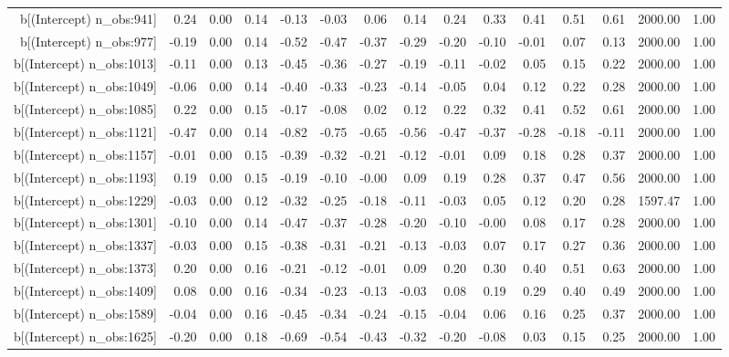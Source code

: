 \begin{table}[ht]
\begin{tabular}{rrrrrrrrrrrrrrr}
  b[(Intercept) n\_obs:941] & 0.24 & 0.00 & 0.14 & -0.13 & -0.03 & 0.06 & 0.14 & 0.24 & 0.33 & 0.41 & 0.51 & 0.61 & 2000.00 & 1.00 \\ 
  b[(Intercept) n\_obs:977] & -0.19 & 0.00 & 0.14 & -0.52 & -0.47 & -0.37 & -0.29 & -0.20 & -0.10 & -0.01 & 0.07 & 0.13 & 2000.00 & 1.00 \\ 
  b[(Intercept) n\_obs:1013] & -0.11 & 0.00 & 0.13 & -0.45 & -0.36 & -0.27 & -0.19 & -0.11 & -0.02 & 0.05 & 0.15 & 0.22 & 2000.00 & 1.00 \\ 
  b[(Intercept) n\_obs:1049] & -0.06 & 0.00 & 0.14 & -0.40 & -0.33 & -0.23 & -0.14 & -0.05 & 0.04 & 0.12 & 0.22 & 0.28 & 2000.00 & 1.00 \\ 
  b[(Intercept) n\_obs:1085] & 0.22 & 0.00 & 0.15 & -0.17 & -0.08 & 0.02 & 0.12 & 0.22 & 0.32 & 0.41 & 0.52 & 0.61 & 2000.00 & 1.00 \\ 
  b[(Intercept) n\_obs:1121] & -0.47 & 0.00 & 0.14 & -0.82 & -0.75 & -0.65 & -0.56 & -0.47 & -0.37 & -0.28 & -0.18 & -0.11 & 2000.00 & 1.00 \\ 
  b[(Intercept) n\_obs:1157] & -0.01 & 0.00 & 0.15 & -0.39 & -0.32 & -0.21 & -0.12 & -0.01 & 0.09 & 0.18 & 0.28 & 0.37 & 2000.00 & 1.00 \\ 
  b[(Intercept) n\_obs:1193] & 0.19 & 0.00 & 0.15 & -0.19 & -0.10 & -0.00 & 0.09 & 0.19 & 0.28 & 0.37 & 0.47 & 0.56 & 2000.00 & 1.00 \\ 
  b[(Intercept) n\_obs:1229] & -0.03 & 0.00 & 0.12 & -0.32 & -0.25 & -0.18 & -0.11 & -0.03 & 0.05 & 0.12 & 0.20 & 0.28 & 1597.47 & 1.00 \\ 
  b[(Intercept) n\_obs:1301] & -0.10 & 0.00 & 0.14 & -0.47 & -0.37 & -0.28 & -0.20 & -0.10 & -0.00 & 0.08 & 0.17 & 0.28 & 2000.00 & 1.00 \\ 
  b[(Intercept) n\_obs:1337] & -0.03 & 0.00 & 0.15 & -0.38 & -0.31 & -0.21 & -0.13 & -0.03 & 0.07 & 0.17 & 0.27 & 0.36 & 2000.00 & 1.00 \\ 
  b[(Intercept) n\_obs:1373] & 0.20 & 0.00 & 0.16 & -0.21 & -0.12 & -0.01 & 0.09 & 0.20 & 0.30 & 0.40 & 0.51 & 0.63 & 2000.00 & 1.00 \\ 
  b[(Intercept) n\_obs:1409] & 0.08 & 0.00 & 0.16 & -0.34 & -0.23 & -0.13 & -0.03 & 0.08 & 0.19 & 0.29 & 0.40 & 0.49 & 2000.00 & 1.00 \\ 
  b[(Intercept) n\_obs:1589] & -0.04 & 0.00 & 0.16 & -0.45 & -0.34 & -0.24 & -0.15 & -0.04 & 0.06 & 0.16 & 0.25 & 0.37 & 2000.00 & 1.00 \\ 
  b[(Intercept) n\_obs:1625] & -0.20 & 0.00 & 0.18 & -0.69 & -0.54 & -0.43 & -0.32 & -0.20 & -0.08 & 0.03 & 0.15 & 0.25 & 2000.00 & 1.00 \\ 

\end{tabular}
\end{table}
